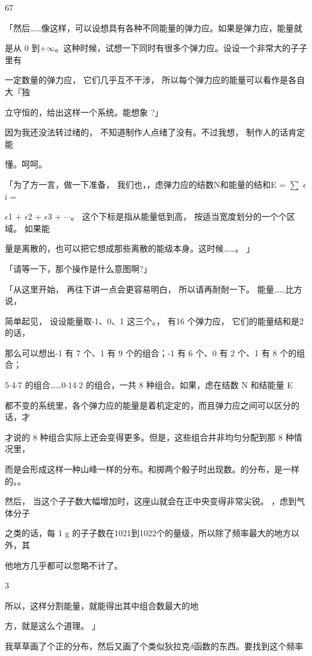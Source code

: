 67\par
「然后……像这样，可以设想具有各种不同能量的弹力应。如果是弹力应，能量就\par
是从 0 到+$\infty$。这种时候，试想一下同时有很多个弹力应。设设一个非常大的子子里有\par
一定数量的弹力应， 它们几乎互不干涉， 所以每个弹力应的能量可以看作是各自大『独\par
立守恒的，给出这样一个系统。能想象 ?」\par
因为我还没法转过绪的， 不知道制作人点绪了没有。不过我想， 制作人的话肯定能\par
懂。呵呵。\par
「为了方一言，做一下准备， 我们也，，虑弹力应的结数N和能量的结和E = $\sum$ $\epsilon$i =\par
$\epsilon$1 + $\epsilon$2 + $\epsilon$3 + $\cdots$。 这个下标是指从能量低到高， 按适当宽度划分的一个个区域。 如果能\par
量是离散的，也可以把它想成那些离散的能级本身。这时候……。 」\par
「请等一下，那个操作是什么意图啊?」\par
「从这里开始， 再往下讲一点会更容易明白， 所以请再耐耐一下。 能量……比方说，\par
简单起见， 设设能量取-1、0、1 这三个。， 有16 个弹力应， 它们的能量结和是2 的话，\par
那么可以想出-1 有 7 个、1 有 9 个的组合；-1 有 6 个、0 有 2 个、1 有 8 个的组合；\par
5$\cdot$4$\cdot$7 的组合……0$\cdot$14$\cdot$2 的组合，一共 8 种组合。如果，虑在结数 N 和结能量 E\par
都不变的系统里，各个弹力应的能量是着机定定的，而且弹力应之间可以区分的话，才\par
才说的 8 种组合实际上还会变得更多。但是，这些组合并非均匀分配到那 8 种情况里，\par
而是会形成这样一种山峰一样的分布。和掷两个骰子时出现数。的分布，是一样的。。\par
然后， 当这个子子数大幅增加时，这座山就会在正中央变得非常尖锐。 ，虑到气体分子\par
之类的话，每 1 g 的子子数在1021到1022个的量级，所以除了频率最大的地方以外，其\par
他地方几乎都可以忽略不计了。\par
3\par
所以，这样分割能量，就能得出其中组合数最大的地\par
方，就是这么个道理。 」\par
我草草画了个正的分布，然后又画了个类似狄拉克$\delta$函数的东西。要找到这个频率\par
